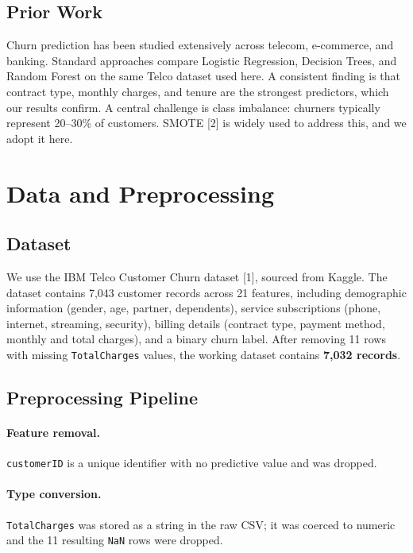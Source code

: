 \documentclass{article}
\begin{document}
\subsection{Prior Work}

Churn prediction has been studied extensively across telecom, e-commerce, and
banking. Standard approaches compare Logistic Regression, Decision Trees, and Random Forest on the same Telco dataset used here. A consistent finding is that contract type, monthly charges, and
tenure are the strongest predictors, which our results confirm. A central
challenge is class imbalance: churners typically represent 20--30\% of
customers. SMOTE [2] is widely used to address this, and we adopt it here.


\section{Data and Preprocessing}

\subsection{Dataset}

We use the IBM Telco Customer Churn dataset [1], sourced from Kaggle. The
dataset contains 7,043 customer records across 21 features, including
demographic information (gender, age, partner, dependents), service
subscriptions (phone, internet, streaming, security), billing details
(contract type, payment method, monthly and total charges), and a binary
churn label. After removing 11 rows with missing \texttt{TotalCharges}
values, the working dataset contains \textbf{7,032 records}.

\subsection{Preprocessing Pipeline}

\paragraph{Feature removal.}
\texttt{customerID} is a unique identifier with no predictive value and was
dropped.

\paragraph{Type conversion.}
\texttt{TotalCharges} was stored as a string in the raw CSV; it was coerced
to numeric and the 11 resulting \texttt{NaN} rows were dropped.
\end{document}
